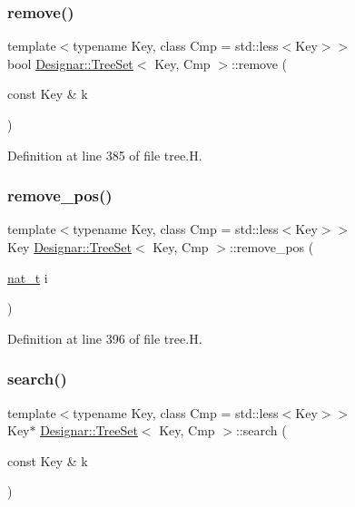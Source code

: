 \subsubsection{\texorpdfstring{remove()}{remove()}}
{\footnotesize\ttfamily template$<$typename Key, class Cmp = std\+::less$<$\+Key$>$$>$ \\
bool \hyperlink{class_designar_1_1_tree_set}{Designar\+::\+Tree\+Set}$<$ Key, Cmp $>$\+::remove (\begin{DoxyParamCaption}\item[{const Key \&}]{k }\end{DoxyParamCaption})\hspace{0.3cm}{\ttfamily [inline]}}



Definition at line 385 of file tree.\+H.

\mbox{\label{class_designar_1_1_tree_set_ade9d7fc31ba5f1b0313a9182f2f71675}} 
\subsubsection{\texorpdfstring{remove\+\_\+pos()}{remove\_pos()}}
{\footnotesize\ttfamily template$<$typename Key, class Cmp = std\+::less$<$\+Key$>$$>$ \\
Key \hyperlink{class_designar_1_1_tree_set}{Designar\+::\+Tree\+Set}$<$ Key, Cmp $>$\+::remove\+\_\+pos (\begin{DoxyParamCaption}\item[{\hyperlink{namespace_designar_aa72662848b9f4815e7bf31a7cf3e33d1}{nat\+\_\+t}}]{i }\end{DoxyParamCaption})\hspace{0.3cm}{\ttfamily [inline]}}



Definition at line 396 of file tree.\+H.

\mbox{\label{class_designar_1_1_tree_set_a1f94f8b93dc1e0f9769ce2e7cfb4762f}} 
\subsubsection{\texorpdfstring{search()}{search()}\hspace{0.1cm}{\footnotesize\ttfamily [1/2]}}
{\footnotesize\ttfamily template$<$typename Key, class Cmp = std\+::less$<$\+Key$>$$>$ \\
Key$\ast$ \hyperlink{class_designar_1_1_tree_set}{Designar\+::\+Tree\+Set}$<$ Key, Cmp $>$\+::search (\begin{DoxyParamCaption}\item[{const Key \&}]{k }\end{DoxyParamCaption})\hspace{0.3cm}{\ttfamily [inline]}}



